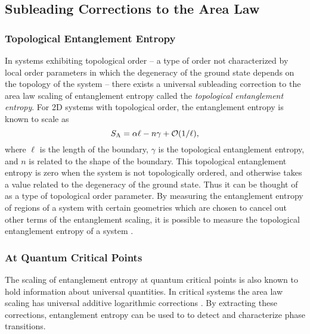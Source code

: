 \subsection{Subleading Corrections to the Area Law}
\subsubsection{Topological Entanglement Entropy}

In systems exhibiting topological order -- a type of order not characterized by local order parameters in which the degeneracy of the ground state depends on the topology of the system -- there exists a universal subleading correction to the area law scaling of entanglement entropy called the {\it topological entanglement entropy}.
For 2D systems with topological order, the entanglement entropy is known to scale as  \cite{Bbob, KP}
\begin{equation} \label{AL}
S_{\rm A} = \alpha \ell - n \gamma + \mathcal{O}(1/\ell),
\end{equation}
where $\ell$ is the length of the boundary, $\gamma$ is the topological entanglement entropy, and $n$ is related to the shape of the boundary.
This topological entanglement entropy is zero when the system is not topologically ordered, and  otherwise takes a value related to the degeneracy of the ground state.
Thus it can be thought of as a type of topological order parameter.
By measuring the entanglement entropy of regions of a system with certain geometries which are chosen to cancel out other terms of the entanglement scaling, it is possible to measure the topological entanglement entropy of a system \cite{LW}.

\subsubsection{At Quantum Critical Points}

The scaling of entanglement entropy at quantum critical points is also known to hold information about universal quantities.
In critical systems the area law scaling has universal additive logarithmic corrections \cite{Casini2007,Ryu, max}.
By extracting these corrections, entanglement entropy can be used to to detect and characterize phase transitions.



